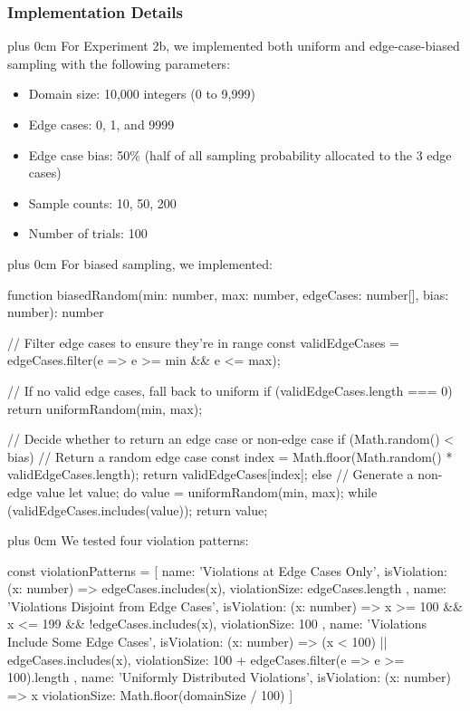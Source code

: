\documentclass[conference]{IEEEtran}
\newcommand{\justifytext}{\leftskip=0pt \rightskip=0pt plus 0cm}
\begin{document}
\subsubsection{Implementation Details}

\justifytext
For Experiment 2b, we implemented both uniform and edge-case-biased sampling with the following parameters:

\begin{itemize}
\item Domain size: 10,000 integers (0 to 9,999)
\item Edge cases: 0, 1, and 9999
\item Edge case bias: 50\% (half of all sampling probability allocated to the 3 edge cases)
\item Sample counts: 10, 50, 200
\item Number of trials: 100
\end{itemize}

\justifytext
For biased sampling, we implemented:

\begin{wrappedcode}
function biasedRandom(min: number, max: number, edgeCases: number[], bias: number): number {
  // Filter edge cases to ensure they're in range
  const validEdgeCases = edgeCases.filter(e => e >= min && e <= max);
  
  // If no valid edge cases, fall back to uniform
  if (validEdgeCases.length === 0) {
    return uniformRandom(min, max);
  }
  
  // Decide whether to return an edge case or non-edge case
  if (Math.random() < bias) {
    // Return a random edge case
    const index = Math.floor(Math.random() * validEdgeCases.length);
    return validEdgeCases[index];
  } else {
    // Generate a non-edge value
    let value;
    do {
      value = uniformRandom(min, max);
    } while (validEdgeCases.includes(value));
    return value;
  }
}
\end{wrappedcode}

\justifytext
We tested four violation patterns:

\begin{wrappedcode}
const violationPatterns = [
  { 
    name: 'Violations at Edge Cases Only',
    isViolation: (x: number) => edgeCases.includes(x),
    violationSize: edgeCases.length
  },
  { 
    name: 'Violations Disjoint from Edge Cases',
    isViolation: (x: number) => x >= 100 && x <= 199 && !edgeCases.includes(x),
    violationSize: 100
  },
  { 
    name: 'Violations Include Some Edge Cases',
    isViolation: (x: number) => (x < 100) || edgeCases.includes(x),
    violationSize: 100 + edgeCases.filter(e => e >= 100).length
  },
  { 
    name: 'Uniformly Distributed Violations',
    isViolation: (x: number) => x %
    violationSize: Math.floor(domainSize / 100)
  }
]
\end{wrappedcode}
\end{document}

